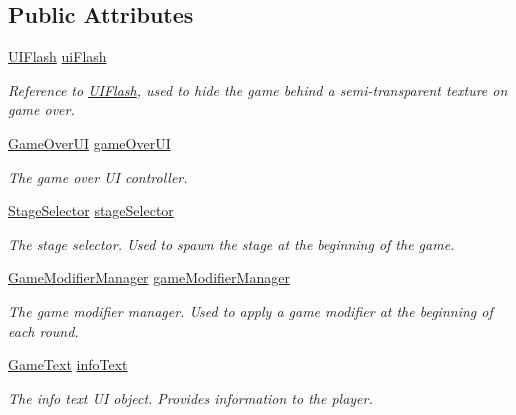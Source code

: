 \subsection*{Public Attributes}
\begin{DoxyCompactItemize}
\item 
\hyperlink{class_multi_stack_1_1_u_i_flash}{U\+I\+Flash} \hyperlink{class_multi_stack_1_1_game_manager_aa3378e26e4669efb5cc272dfb2c80d6a}{ui\+Flash}
\begin{DoxyCompactList}\small\item\em Reference to \hyperlink{class_multi_stack_1_1_u_i_flash}{U\+I\+Flash}, used to hide the game behind a semi-\/transparent texture on game over. \end{DoxyCompactList}\item 
\hyperlink{class_multi_stack_1_1_game_over_u_i}{Game\+Over\+U\+I} \hyperlink{class_multi_stack_1_1_game_manager_a6b33f48d117d4db0a6873b1028eebb38}{game\+Over\+U\+I}
\begin{DoxyCompactList}\small\item\em The game over U\+I controller. \end{DoxyCompactList}\item 
\hyperlink{class_multi_stack_1_1_stage_selector}{Stage\+Selector} \hyperlink{class_multi_stack_1_1_game_manager_a5a526de2c9547502f5a8613d609624ef}{stage\+Selector}
\begin{DoxyCompactList}\small\item\em The stage selector. Used to spawn the stage at the beginning of the game. \end{DoxyCompactList}\item 
\hyperlink{class_multi_stack_1_1_game_modifier_manager}{Game\+Modifier\+Manager} \hyperlink{class_multi_stack_1_1_game_manager_a252e0694a8be8d574757504fc5549afd}{game\+Modifier\+Manager}
\begin{DoxyCompactList}\small\item\em The game modifier manager. Used to apply a game modifier at the beginning of each round. \end{DoxyCompactList}\item 
\hyperlink{class_multi_stack_1_1_game_text}{Game\+Text} \hyperlink{class_multi_stack_1_1_game_manager_a479c44610a6637e259add0fa0c3128e4}{info\+Text}
\begin{DoxyCompactList}\small\item\em The info text U\+I object. Provides information to the player. \end{DoxyCompactList}\end{DoxyCompactItemize}
